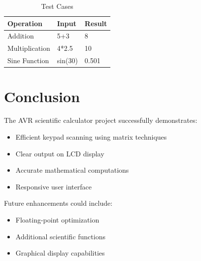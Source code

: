 \documentclass{article}
\begin{document}
\begin{table}[H]
\centering
\caption{Test Cases}
\label{tab:tests}
\begin{tabular}{lll}
\toprule
\textbf{Operation} & \textbf{Input} & \textbf{Result} \\
\midrule
Addition & 5+3 & 8 \\
Multiplication & 4*2.5 & 10 \\
Sine Function & sin(30) & 0.501 \\
\bottomrule
\end{tabular}
\end{table}

\section{Conclusion}
The AVR scientific calculator project successfully demonstrates:
\begin{itemize}
\item Efficient keypad scanning using matrix techniques
\item Clear output on LCD display
\item Accurate mathematical computations
\item Responsive user interface
\end{itemize}

Future enhancements could include:
\begin{itemize}
\item Floating-point optimization
\item Additional scientific functions
\item Graphical display capabilities
\end{itemize}
\end{document}
